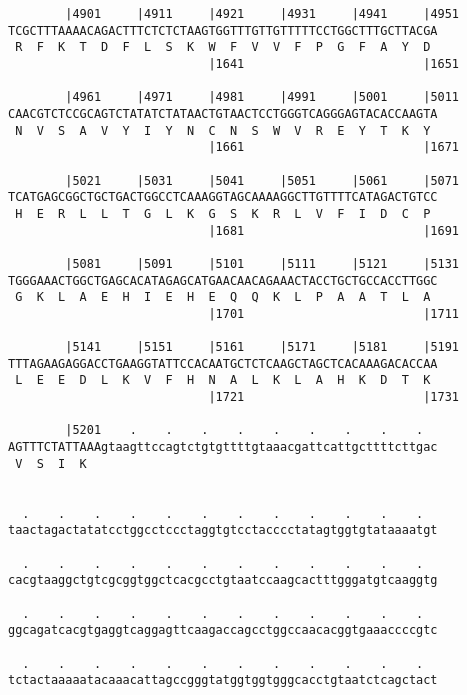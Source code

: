 \documentclass{article}
\begin{document}
\begin{Verbatim}
        |4901     |4911     |4921     |4931     |4941     |4951
TCGCTTTAAAACAGACTTTCTCTCTAAGTGGTTTGTTGTTTTTCCTGGCTTTGCTTACGA
 R  F  K  T  D  F  L  S  K  W  F  V  V  F  P  G  F  A  Y  D 
                            |1641                         |1651
  
        |4961     |4971     |4981     |4991     |5001     |5011
CAACGTCTCCGCAGTCTATATCTATAACTGTAACTCCTGGGTCAGGGAGTACACCAAGTA
 N  V  S  A  V  Y  I  Y  N  C  N  S  W  V  R  E  Y  T  K  Y 
                            |1661                         |1671
  
        |5021     |5031     |5041     |5051     |5061     |5071
TCATGAGCGGCTGCTGACTGGCCTCAAAGGTAGCAAAAGGCTTGTTTTCATAGACTGTCC
 H  E  R  L  L  T  G  L  K  G  S  K  R  L  V  F  I  D  C  P 
                            |1681                         |1691
  
        |5081     |5091     |5101     |5111     |5121     |5131
TGGGAAACTGGCTGAGCACATAGAGCATGAACAACAGAAACTACCTGCTGCCACCTTGGC
 G  K  L  A  E  H  I  E  H  E  Q  Q  K  L  P  A  A  T  L  A 
                            |1701                         |1711
  
        |5141     |5151     |5161     |5171     |5181     |5191
TTTAGAAGAGGACCTGAAGGTATTCCACAATGCTCTCAAGCTAGCTCACAAAGACACCAA
 L  E  E  D  L  K  V  F  H  N  A  L  K  L  A  H  K  D  T  K 
                            |1721                         |1731
  
        |5201    .    .    .    .    .    .    .    .    .  
AGTTTCTATTAAAgtaagttccagtctgtgttttgtaaacgattcattgcttttcttgac
 V  S  I  K                                                 
                                                            
  
  .    .    .    .    .    .    .    .    .    .    .    .  
taactagactatatcctggcctccctaggtgtcctacccctatagtggtgtataaaatgt
                                                            
  .    .    .    .    .    .    .    .    .    .    .    .  
cacgtaaggctgtcgcggtggctcacgcctgtaatccaagcactttgggatgtcaaggtg
                                                            
  .    .    .    .    .    .    .    .    .    .    .    .  
ggcagatcacgtgaggtcaggagttcaagaccagcctggccaacacggtgaaaccccgtc
                                                            
  .    .    .    .    .    .    .    .    .    .    .    .  
tctactaaaaatacaaacattagccgggtatggtggtgggcacctgtaatctcagctact
                                                            

\end{Verbatim}
\end{document}
